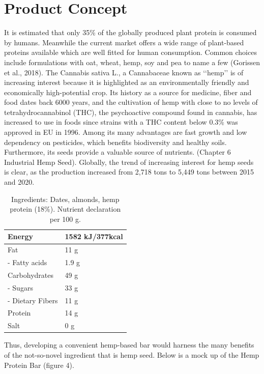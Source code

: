 \section{Product Concept}
It is estimated that only 35\% of the globally produced plant protein is consumed by humans. Meanwhile the current market offers a wide range of plant-based proteins available which are well fitted for human consumption. Common choices include formulations with oat, wheat, hemp, soy and pea to name a few (Gorissen et al., 2018). The Cannabis sativa L., a Cannabaceae known as ‘‘hemp’’ is of increasing interest because it is highlighted as an environmentally friendly and economically high-potential crop. Its history as a source for medicine, fiber and food dates back 6000 years, and the cultivation of hemp with close to no levels of tetrahydrocannabinol (THC), the psychoactive compound found in cannabis, has increased to use in foods since strains with a THC content below 0.3\% was approved in EU in 1996. Among its many advantages are fast growth and low dependency on pesticides, which benefits biodiversity and healthy soils. Furthermore, its seeds provide a valuable source of nutrients. (Chapter 6 Industrial Hemp Seed). Globally, the trend of increasing interest for hemp seeds is clear, as the production increased from 2,718 tons to 5,449 tons between 2015 and 2020. 

\begin{table}[h] 
    \centering
    \caption{Ingredients: Dates, almonds, hemp protein (18\%). Nutrient declaration per 100 g.}
    \label{tab:your_label}
    \begin{tabular}{|l|l|} 
        \hline
        Energy & 1582 kJ/377kcal \\ 
        \hline
        Fat & 11 g \\ 
        \hline
        - Fatty acids & 1.9 g \\ 
        \hline
        Carbohydrates & 49 g \\ 
        \hline
        - Sugars & 33 g \\ 
        \hline
        - Dietary Fibers & 11 g \\ 
        \hline
        Protein & 14 g \\ 
        \hline
        Salt & 0 g \\ 
        \hline
    \end{tabular}
\end{table}

\vspace{1em}
Thus, developing a convenient hemp-based bar would harness the many benefits of the not-so-novel ingredient that is hemp seed. Below is a mock up of the Hemp Protein Bar (figure 4).

